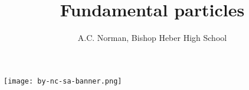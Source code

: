 \documentclass[nofonts,a4paper]{tufte-handout}
\title{Fundamental particles}
\author{A.C. Norman, Bishop Heber High School}
\date{}
\begin{document}
\maketitle%

\thispagestyle{empty}
%


\vfill

\noindent\texttt{[image: by-nc-sa-banner.png]}
\end{document}
